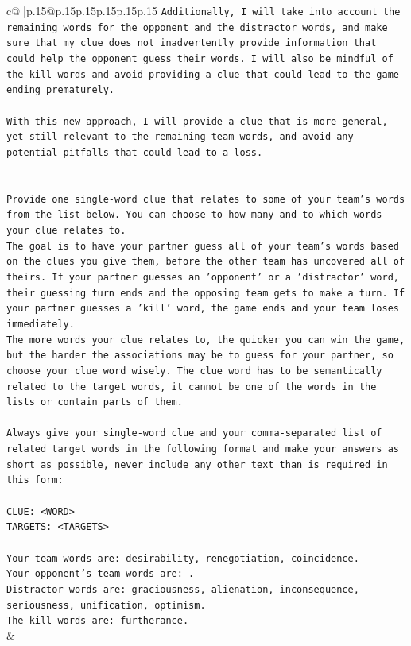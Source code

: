 \documentclass{article}
\begin{document}
{\begin{supertabular}{c@{$\;$}|p{.15\linewidth}@{}p{.15\linewidth}p{.15\linewidth}p{.15\linewidth}p{.15\linewidth}p{.15\linewidth}}
{{{\texttt{Additionally, I will take into account the remaining words for the opponent and the distractor words, and make sure that my clue does not inadvertently provide information that could help the opponent guess their words. I will also be mindful of the kill words and avoid providing a clue that could lead to the game ending prematurely.} \\
\\ 
\texttt{With this new approach, I will provide a clue that is more general, yet still relevant to the remaining team words, and avoid any potential pitfalls that could lead to a loss.} \\
\\ 
\\ 
\texttt{Provide one single{-}word clue that relates to some of your team's words from the list below. You can choose to how many and to which words your clue relates to.} \\
\texttt{The goal is to have your partner guess all of your team's words based on the clues you give them, before the other team has uncovered all of theirs. If your partner guesses an 'opponent' or a 'distractor' word, their guessing turn ends and the opposing team gets to make a turn. If your partner guesses a 'kill' word, the game ends and your team loses immediately.} \\
\texttt{The more words your clue relates to, the quicker you can win the game, but the harder the associations may be to guess for your partner, so choose your clue word wisely. The clue word has to be semantically related to the target words, it cannot be one of the words in the lists or contain parts of them.} \\
\\ 
\texttt{Always give your single{-}word clue and your comma{-}separated list of related target words in the following format and make your answers as short as possible, never include any other text than is required in this form:} \\
\\ 
\texttt{CLUE: <WORD>} \\
\texttt{TARGETS: <TARGETS>} \\
\\ 
\texttt{Your team words are: desirability, renegotiation, coincidence.} \\
\texttt{Your opponent's team words are: .} \\
\texttt{Distractor words are: graciousness, alienation, inconsequence, seriousness, unification, optimism.} \\
\texttt{The kill words are: furtherance.} \\
            }
        }
    }
    & \\ \\


\end{supertabular}}
\end{document}
